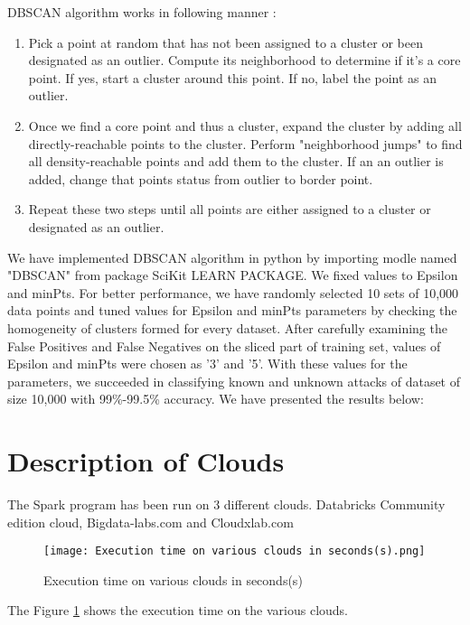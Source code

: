 \documentclass{acm_proc_article-sp}
\begin{document}
\begin{enumerate}
DBSCAN algorithm works in following manner :
\begin{enumerate}
\item Pick a point at random that has not been assigned to a cluster or been designated as an outlier. Compute its neighborhood to determine if it's a core point. If yes, start a cluster around this point. If no, label the point as an outlier.
\item Once we find a core point and thus a cluster, expand the cluster by adding all directly-reachable points to the cluster. Perform "neighborhood jumps" to find all density-reachable points and add them to the cluster. If an an outlier is added, change that points status from outlier to border point.
\item Repeat these two steps until all points are either assigned to a cluster or designated as an outlier.
\end{enumerate}

We have implemented DBSCAN algorithm in python by importing modle named "DBSCAN" from package SciKit LEARN PACKAGE. We fixed values to Epsilon and minPts. For better performance, we have randomly selected 10 sets of 10,000 data points and tuned values for Epsilon and minPts parameters by checking the homogeneity of clusters formed for every dataset. After carefully examining the False Positives and False Negatives on the sliced part of training set, values of Epsilon and minPts were chosen as '3' and '5'. With these values for the parameters, we succeeded in classifying known and unknown attacks of dataset of size 10,000 with 99\%-99.5\% accuracy. We have presented the results below:
\end{enumerate}

\section{Description of Clouds}
The Spark program has been run on 3 different clouds. Databricks Community edition cloud, Bigdata-labs.com and Cloudxlab.com
\begin{figure}[h]
\texttt{[image: Execution time on various clouds in seconds(s).png]}
\centering
\caption{Execution time on various clouds in seconds(s)}
\label{Execution time on various clouds in seconds(s)}
\end{figure}
The Figure \ref{Execution time on various clouds in seconds(s)} shows the execution time on the various clouds.
\end{document}
